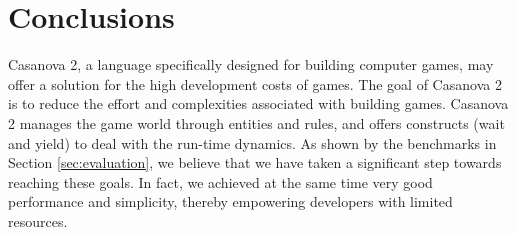 




\section{Conclusions}
\label{sec:conclusions}

Casanova 2, a language specifically designed for building computer games, may offer a solution for the high development costs of games. The goal of Casanova 2 is to reduce the effort and complexities associated with building games. Casanova 2 manages the game world through entities and rules, and offers constructs (wait and yield) to deal with the run-time dynamics. As shown by the benchmarks in Section \ref{sec:evaluation}, we believe that we have taken a significant step towards reaching these goals. In fact, we achieved at the same time very good performance and simplicity, thereby empowering developers with limited resources. 